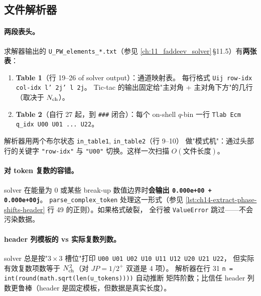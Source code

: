 \subsection{文件解析器}
\label{subsec:ch14-py-parser}



\paragraph{两段表头。}
求解器输出的 \texttt{U\_PW\_elements\_*.txt}（参见
\cref{ch:11_faddeev_solver}\(\,\)\S 11.5）有\textbf{两张表}：
\begin{enumerate}
  \item \textbf{Table 1}（行 19--26 of solver output）：通道映射表。
        每行格式 \texttt{Uij  row-idx  col-idx  l'  2j'  l  2j}。
        Tic-tac 的输出固定给"主对角 + 主对角下方"的几行（取决于
        \(N_{\rm ch}\)）。
  \item \textbf{Table 2}（自行 27 起，到 \texttt{\#\#\#} 闭合）：每个
        on-shell \(q\)-bin 一行 \texttt{Tlab Ecm q\_idx U00 U01 ... U22}。
\end{enumerate}
解析器用两个布尔状态 \texttt{in\_table1}, \texttt{in\_table2}（行 9--10）
做"模式机"：通过头部行的关键字
\verb|"row-idx"| 与 \verb|"U00"| 切换。这样一次扫描 \(O(\text{文件长度})\)。

\paragraph{对 token 复数的容错。}
solver 在能量为 0 或某些 break-up 数值边界时\textbf{会输出 \texttt{0.000e+00 + 0.000e+00j}}。
\texttt{parse\_complex\_token} 处理这一形式（参见
\cref{lst:ch14-extract-phase-shifts-header} 行 49 的正则）。如果格式破裂，
全行被 \texttt{ValueError} 跳过——不会污染数据。

\paragraph{header 列模板的 vs 实际复数列数。}
solver 总是按"\(3\!\times\!3\) 槽位"打印 \verb|U00 U01 U02 U10 U11 U12 U20 U21 U22|，
但实际有效复数项数等于 \(N_{\rm ch}^2\)（对 \(JP=1/2^+\) 双道是 4 项）。
解析器在行 31 \verb|n = int(round(math.sqrt(len(u_tokens))))| 自动推断
矩阵阶数；比信任 header 列数更鲁棒（header 是固定模板，但数据是真实长度）。

